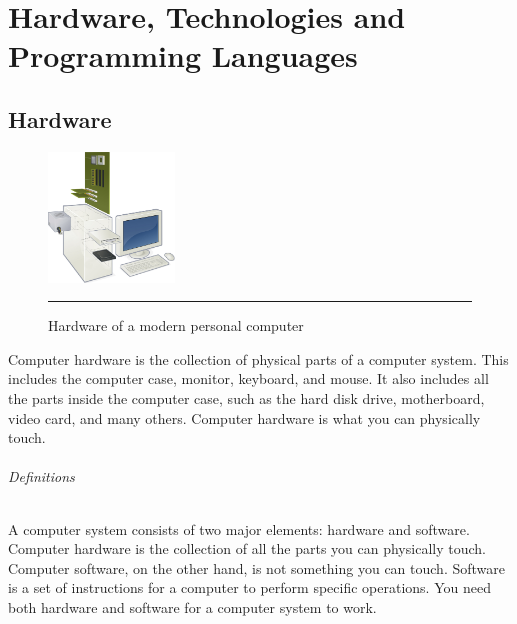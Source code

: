 
\chapter{Hardware, Technologies and Programming Languages} %

\label{Chapter2} %



\section{Hardware}
\begin{figure}
  \begin{center}
    \includegraphics[width=0.3\textwidth]{./Pictures/hardware.jpg}
  \end{center}
  \rule{0.3\textwidth}{0.5pt}
  \caption{Hardware of a modern personal computer}
  \label{fig:hardware}
\end{figure}
Computer hardware is the collection of physical parts of a computer system. This includes the computer case, monitor, keyboard, and mouse. It also includes all the parts inside the computer case, such as the hard disk drive, motherboard, video card, and many others. Computer hardware is what you can physically touch.

\subparagraph*{Definitions}
\hfill \break
A computer system consists of two major elements: hardware and software. Computer hardware is the collection of all the parts you can physically touch. Computer software, on the other hand, is not something you can touch. Software is a set of instructions for a computer to perform specific operations. You need both hardware and software for a computer system to work.


